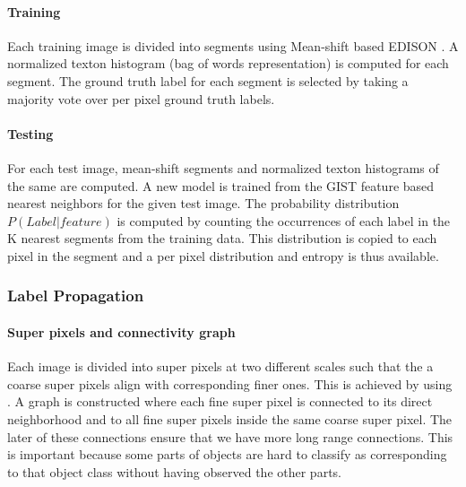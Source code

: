 \documentclass{article} %
\begin{document}
\paragraph{Training} Each training image is divided into segments using
Mean-shift based EDISON \cite{meanshift}.
A normalized texton histogram (bag of words representation) is computed for each segment.
The ground truth label for each segment is selected by taking a majority vote over per pixel ground truth labels.

\paragraph{Testing} For each test image, mean-shift segments and normalized texton histograms of the same are computed.
A new model is trained from the GIST feature based nearest neighbors for the given test image.
The probability distribution $P(Label | feature)$ is computed by counting the occurrences of each label in the K nearest segments from the training data.
This distribution is copied to each pixel in the segment and a per pixel distribution and entropy is thus available.

\subsubsection{Label Propagation}
\label{sec:labprop}
\paragraph{Super pixels and connectivity graph}
Each image is divided into super pixels at two different scales such that
the a coarse super pixels align with corresponding finer ones.
This is achieved by using \cite{}.%
A graph is constructed where each fine super pixel is connected to its
direct neighborhood and to all fine super pixels inside the same
coarse super pixel.
The later of these connections ensure that we have more long range connections. This is important because some parts of objects are hard to classify as corresponding to that object class without having observed the other parts.
\end{document}
